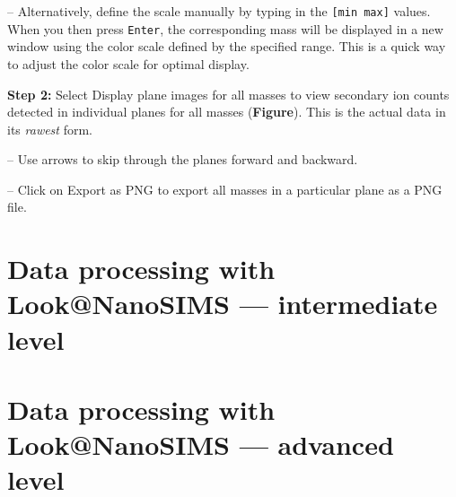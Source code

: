\documentclass[a4paper, 11pt]{article}
\newcommand{\ttt}[1]{\texttt{#1}}
\newcommand{\lans}[1]{{\color{magenta}#1}}
\newcommand\mnote{\marginnote{\fbox{\textbf{\bf Note}}}}
\newcommand\addon[1]{-- {\small #1}}
\newcommand\figref[0]{\textbf{Figure}}
\newcommand\s[1]{\noindent\textbf{Step #1:}}
\begin{document}
\mnote
\addon{Alternatively, define the scale manually by typing in the \ttt{[min max]} values. When you then press \ttt{Enter}, the corresponding mass will be displayed in a new window using the color scale defined by the specified range. This is a quick way to adjust the color scale for optimal display.}

\s2 Select \lans{Display plane images for all masses} to view secondary ion counts detected in individual planes for all masses (\figref). This is the actual data in its \emph{rawest} form.

\addon{Use arrows to skip through the planes forward and backward.}

\addon{Click on \lans{Export as PNG} to export all masses in a particular plane as a PNG file.}



\section{Data processing with Look@NanoSIMS --- intermediate level}
\label{sec:level2}


\section{Data processing with Look@NanoSIMS --- advanced level}
\label{sec:level3}
\end{document}
